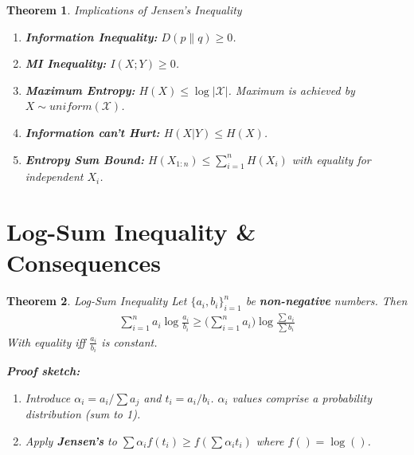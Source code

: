 \documentclass[a4paper,12pt]{report}
\newtheorem{theorem}{Theorem}
\begin{document}
\begin{theorem}{Implications of Jensen's Inequality}
\begin{enumerate}
\item \textbf{Information Inequality: } $D(p\| q) \geq 0$.
\item \textbf{MI Inequality: } $I(X; Y) \geq 0$.
\item \textbf{Maximum Entropy: } $H(X) \leq \log |\mathcal X|$. Maximum is
achieved by $X \sim {uniform} (\mathcal X)$.
\item \textbf{Information can't Hurt: } $H(X|Y) \leq H(X)$.
\item \textbf{Entropy Sum Bound: } $H(X_{1:n}) \leq \sum_{i=1}^{n} H(X_i)$ with
equality for independent $X_i$.
\end{enumerate}
\end{theorem}



\section{Log-Sum Inequality \& Consequences}

\begin{theorem}{Log-Sum Inequality}
Let $\{a_i, b_i\}_{i=1}^n$ be \textbf{non-negative} numbers. Then 
\begin{align}
\sum_{i=1}^{n} a_i \log \frac{a_i}{b_i} \geq \big(\sum_{i=1}^{n} a_i \big) \log
\frac{\sum a_i}{\sum b_i} 
\end{align}
With equality iff $\frac{a_i}{b_i}$ is constant.

\textbf{Proof sketch: } 
\begin{enumerate}
\item Introduce $\alpha_i = a_i/\sum a_j$ and $t_i = a_i/b_i$. $\alpha_i$ values
comprise a probability distribution (sum to 1). 
\item Apply \textbf{Jensen's} to $\sum \alpha_i f(t_i) \geq f(\sum \alpha_i
t_i)$ where $f() = \log()$.
\end{enumerate}
\end{theorem}
\end{document}

